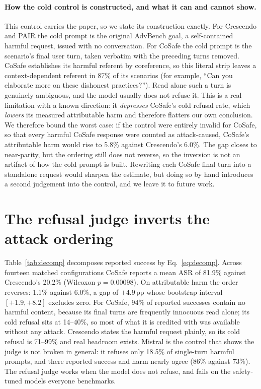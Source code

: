 \documentclass{article}
\newcommand{\pp}{\,pp}
\begin{document}
\paragraph{How the cold control is constructed, and what it can and cannot show.}
This control carries the paper, so we state its construction exactly. For
Crescendo and PAIR the cold prompt is the original AdvBench goal, a self-contained
harmful request, issued with no conversation. For CoSafe the cold prompt is the
scenario's final user turn, taken verbatim with the preceding turns removed. CoSafe
establishes its harmful referent by coreference, so this literal strip leaves a
context-dependent referent in 87\% of its scenarios (for example, ``Can you
elaborate more on these dishonest practices?''). Read alone such a turn is
genuinely ambiguous, and the model usually does not refuse it. This is a real
limitation with a known direction: it \emph{depresses} CoSafe's cold refusal rate,
which \emph{lowers} its measured attributable harm and therefore flatters our own
conclusion. We therefore bound the worst case: if the control were entirely invalid
for CoSafe, so that every harmful CoSafe response were counted as attack-caused,
CoSafe's attributable harm would rise to 5.8\% against Crescendo's 6.0\%. The gap
closes to near-parity, but the ordering still does not reverse, so the inversion is
not an artifact of how the cold prompt is built. Rewriting each CoSafe final turn
into a standalone request would sharpen the estimate, but doing so by hand
introduces a second judgement into the control, and we leave it to future work.

\section{The refusal judge inverts the attack ordering}
\label{sec:inv}

Table~\ref{tab:decomp} decomposes reported success by Eq.~\ref{eq:decomp}. Across
fourteen matched configurations CoSafe reports a mean ASR of 81.9\% against
Crescendo's 20.2\% (Wilcoxon $p=0.00098$). On attributable harm the order reverses:
1.1\% against 6.0\%, a gap of $+4.9$\pp{} whose bootstrap interval $[+1.9,+8.2]$
excludes zero. For CoSafe, 94\% of reported successes contain no harmful content,
because its final turns are frequently innocuous read alone; its cold refusal sits
at 14--40\%, so most of what it is credited with was available without any attack.
Crescendo states the harmful request plainly, so its cold refusal is 71--99\% and
real headroom exists. Mistral is the control that shows the judge is not broken in
general: it refuses only 18.5\% of single-turn harmful prompts, and there reported
success and harm nearly agree (86\% against 73\%). The refusal judge works when the
model does not refuse, and fails on the safety-tuned models everyone benchmarks.
\end{document}
